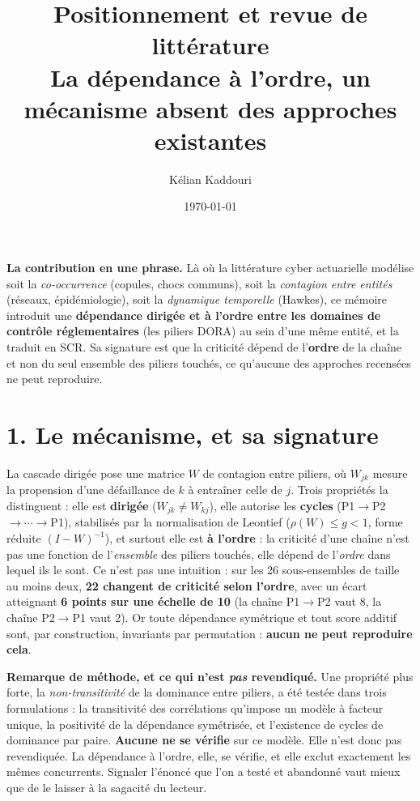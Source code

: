 \documentclass[11pt,a4paper]{article}
\title{\vspace{-1.3cm}\color{navy}\bfseries Positionnement et revue de littérature\\[2pt]
  \large La dépendance à l'ordre, un mécanisme absent des approches existantes}
\author{Kélian Kaddouri}
\date{\today}
\begin{document}
\maketitle
\vspace{-0.7cm}

\begin{cle}
\textbf{La contribution en une phrase.} Là où la littérature cyber actuarielle modélise soit
la \emph{co-occurrence} (copules, chocs communs), soit la \emph{contagion entre entités}
(réseaux, épidémiologie), soit la \emph{dynamique temporelle} (Hawkes), ce mémoire introduit
une \textbf{dépendance dirigée et à l'ordre entre les domaines de contrôle réglementaires}
(les piliers DORA) au sein d'une même entité, et la traduit en SCR. Sa signature est que
la criticité dépend de l'\textbf{ordre} de la chaîne et non du seul ensemble des piliers
touchés, ce qu'aucune des approches recensées ne peut reproduire.
\end{cle}

\section*{1. Le mécanisme, et sa signature}

La cascade dirigée pose une matrice $W$ de contagion entre piliers, où $W_{jk}$ mesure la
propension d'une défaillance de $k$ à entraîner celle de $j$. Trois propriétés la
distinguent : elle est \textbf{dirigée} ($W_{jk}\neq W_{kj}$), elle autorise les
\textbf{cycles} (P1$\to$P2$\to\cdots\to$P1), stabilisés par la normalisation de Leontief
($\rho(W)\le g<1$, forme réduite $(I-W)^{-1}$), et surtout elle est \textbf{à l'ordre} : la
criticité d'une chaîne n'est pas une fonction de l'\emph{ensemble} des piliers touchés, elle
dépend de l'\emph{ordre} dans lequel ils le sont. Ce n'est pas une intuition : sur les 26
sous-ensembles de taille au moins deux, \textbf{22 changent de criticité selon l'ordre},
avec un écart atteignant \textbf{6 points sur une échelle de 10} (la chaîne P1$\to$P2 vaut
8, la chaîne P2$\to$P1 vaut 2). Or toute dépendance symétrique et tout score additif sont,
par construction, invariants par permutation : \textbf{aucun ne peut reproduire cela}.

\begin{cle}
\textbf{Remarque de méthode, et ce qui n'est \emph{pas} revendiqué.} Une propriété plus
forte, la \emph{non-transitivité} de la dominance entre piliers, a été testée dans trois
formulations : la transitivité des corrélations qu'impose un modèle à facteur unique, la
positivité de la dépendance symétrisée, et l'existence de cycles de dominance par paire.
\textbf{Aucune ne se vérifie} sur ce modèle. Elle n'est donc pas revendiquée. La
dépendance à l'ordre, elle, se vérifie, et elle exclut exactement les mêmes concurrents.
Signaler l'énoncé que l'on a testé et abandonné vaut mieux que de le laisser à la
sagacité du lecteur.
\end{cle}
\end{document}
